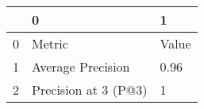 \begin{tabular}{lll}
\toprule
{} &                     0 &      1 \\
\midrule
0 &                Metric &  Value \\
1 &     Average Precision &   0.96 \\
2 &  Precision at 3 (P@3) &      1 \\
\bottomrule
\end{tabular}
